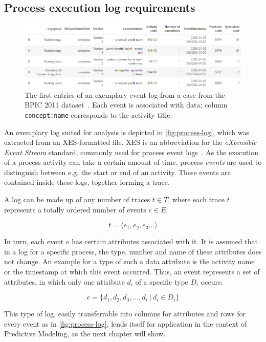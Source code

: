 \subsection{Process execution log requirements}\label{sec:log-structure}
\begin{figure}
    \centering
    \includegraphics[width=\textwidth]{gfx/process-log.png}
    \caption{The first entries of an exemplary event log from a case from the BPIC 2011 dataset~\cite{BPIC2011}. Each event is associated with data; column \texttt{concept:name} corresponds to the activity title.}
    \label{fig:process-log}
\end{figure}

An exemplary log suited for analysis is depicted in \autoref{fig:process-log}, which was extracted from an XES-formatted file.
XES is an abbreviation for the \textit{eXtensible Event Stream} standard, commonly used for process event logs~\cite{gunther2013xes}. As the execution of a process activity can take a certain amount of time, process \textit{events} are used to distinguish between e.g. the start or end of an activity. These events are contained inside these logs, together forming a trace.

A log can be made up of any number of traces $t \in T$, where each trace $t$ represents a totally ordered number of events $e \in E$:

$$ t = \langle e_1, e_2, e_3 \dots \rangle $$

In turn, each event $e$ has certain attributes associated with it. It is assumed that in a log for a specific process, the type, number and name of these attributes does not change. An example for a type of such a data attribute is the activity name or the timestamp at which this event occurred. Thus, an event represents a set of attributes, in which only one attribute $d_i$ of a specific type $D_i$ occurs:

$$ e = \{ d_1, d_2, d_3, ..., d_i\ |\ d_i \in D_i \}$$

This type of log, easily transferrable into columns for attributes and rows for every event as in \autoref{fig:process-log}, lends itself for application in the context of Predictive Modeling, as the next chapter will show.

